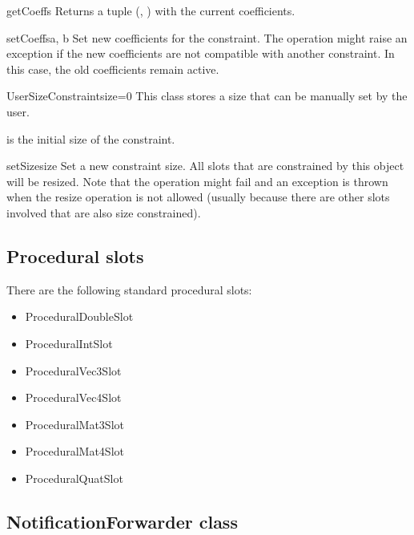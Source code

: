 \begin{methoddesc}{getCoeffs}{}
Returns a tuple (, ) with the current coefficients.
\end{methoddesc}

\begin{methoddesc}{setCoeffs}{a, b}
Set new coefficients for the constraint. The operation might raise an
exception if the new coefficients are not compatible with another
constraint. In this case, the old coefficients remain active.
\end{methoddesc}


\begin{classdesc}{UserSizeConstraint}{size=0}
This class stores a size that can be manually set by the user.

 is the initial size of the constraint.
\end{classdesc}

\begin{methoddesc}{setSize}{size}
Set a new constraint size. All slots that are constrained by this object
will be resized. Note that the operation might fail and an exception is
thrown when the resize operation is not allowed (usually because there
are other slots involved that are also size constrained).
\end{methoddesc}


\subsection{Procedural slots}

There are the following standard procedural slots:

\begin{itemize}
\item ProceduralDoubleSlot
\item ProceduralIntSlot
\item ProceduralVec3Slot
\item ProceduralVec4Slot
\item ProceduralMat3Slot
\item ProceduralMat4Slot
\item ProceduralQuatSlot
\end{itemize}

\subsection{NotificationForwarder class}

